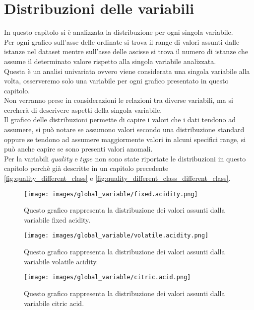 \section{Distribuzioni delle variabili}
In questo capitolo si è analizzata la distribuzione per ogni singola variabile.\\
Per ogni grafico sull'asse delle ordinate si trova il range di valori assunti dalle istanze nel dataset mentre sull'asse delle ascisse si trova il numero di istanze che assume il determinato valore rispetto alla singola variabile analizzata.\\
Questa è un analisi univariata ovvero viene considerata una singola variabile alla volta, osserveremo solo una variabile per ogni grafico presentato in questo capitolo.\\
Non verranno prese in considerazioni le relazioni tra diverse variabili, ma si cercherà di descrivere aspetti della singola variabile.\\
Il grafico delle distribuzioni permette di capire i valori che i dati tendono ad assumere, si può notare se assumono valori secondo una distribuzione standard oppure se tendono ad assumere maggiormente valori in alcuni specifici range, si può anche capire se sono presenti valori anomali.\\
Per la variabili $quality$ e $type$ non sono state riportate le distribuzioni in questo capitolo perchè già descritte in un capitolo precedente \ref{fig:quality_different_class} e \ref{fig:quality_different_class_different_class}.

\begin{figure}[H]
    \centering
    \texttt{[image: images/global\_variable/fixed.acidity.png]}
    \caption{Questo grafico rappresenta la distribuzione dei valori assunti dalla variabile fixed acidity.}
    \label{fig:global_fixed.acidity}
\end{figure}

\begin{figure}[H]
    \centering
    \texttt{[image: images/global\_variable/volatile.acidity.png]}
    \caption{Questo grafico rappresenta la distribuzione dei valori assunti dalla variabile volatile acidity.}
    \label{fig:global_volatile.acidity}
\end{figure}

\begin{figure}[H]
    \centering
    \texttt{[image: images/global\_variable/citric.acid.png]}
    \caption{Questo grafico rappresenta la distribuzione dei valori assunti dalla variabile citric acid.}
    \label{fig:global_citric.acid}
\end{figure}


